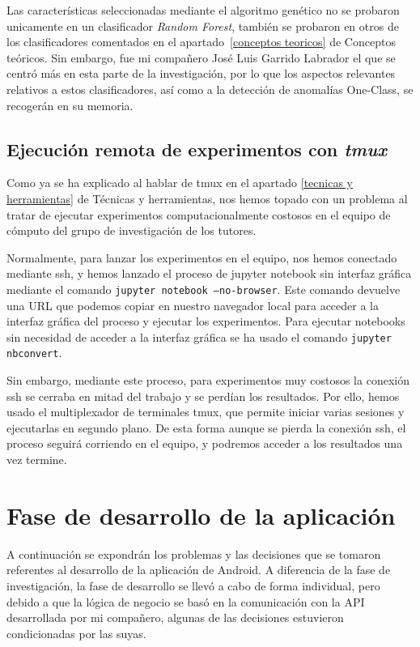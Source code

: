 Las características seleccionadas mediante el algoritmo genético no se probaron unicamente en un clasificador \textit{Random Forest}, también se probaron en otros de los clasificadores comentados en el apartado~\ref{conceptos teoricos} de Conceptos teóricos. Sin embargo, fue mi compañero José Luis Garrido Labrador el que se centró más en esta parte de la investigación, por lo que los aspectos relevantes relativos a estos clasificadores, así como a la detección de anomalías One-Class, se recogerán en su memoria. 

\subsection{Ejecución remota de experimentos con \textit{tmux}}

Como ya se ha explicado al hablar de tmux en el apartado \ref{tecnicas y herramientas} de Técnicas y herramientas, nos hemos topado con un problema al tratar de ejecutar experimentos computacionalmente costosos en el equipo de cómputo del grupo de investigación de los tutores. 

Normalmente, para lanzar los experimentos en el equipo, nos hemos conectado mediante ssh, y hemos lanzado el proceso de jupyter notebook sin interfaz gráfica mediante el comando \texttt{jupyter notebook ---no-browser}. Este comando devuelve una URL que podemos copiar en nuestro navegador local para acceder a la interfaz gráfica del proceso y ejecutar los experimentos. Para ejecutar notebooks sin necesidad de acceder a la interfaz gráfica se ha usado el comando \texttt{jupyter nbconvert}. 

Sin embargo, mediante este proceso, para experimentos muy costosos la conexión ssh se cerraba en mitad del trabajo y se perdían los resultados. Por ello, hemos usado el multiplexador de terminales tmux, que permite iniciar varias sesiones y ejecutarlas en segundo plano. De esta forma aunque se pierda la conexión ssh, el proceso seguirá corriendo en el equipo, y podremos acceder a los resultados una vez termine. 

\section{Fase de desarrollo de la aplicación}

A continuación se expondrán los problemas y las decisiones que se tomaron referentes al desarrollo de la aplicación de Android. A diferencia de la fase de investigación, la fase de desarrollo se llevó a cabo de forma individual, pero debido a que la lógica de negocio se basó en la comunicación con la API desarrollada por mi compañero, algunas de las decisiones estuvieron condicionadas por las suyas. 

